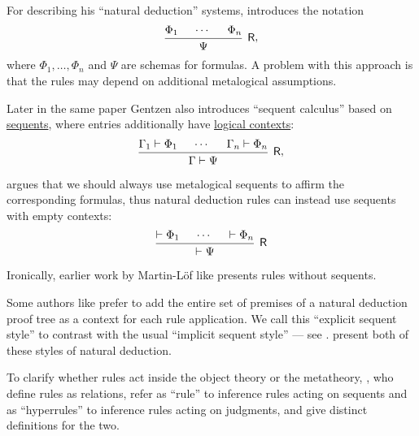 \begin{remark}
  For describing his \enquote{natural deduction} systems,  introduces the notation
  \begin{equation*}
    \begin{prooftree}
      \hypo{ \Phi_1 }
      \hypo{ \cdots }
      \hypo{ \Phi_n }
      \infer3[\logic{R}]{ \Psi }
    \end{prooftree},
  \end{equation*}
  where \( \Phi_1, \ldots, \Phi_n \) and \( \Psi \) are schemas for formulas. A problem with this approach is that the rules may depend on additional metalogical assumptions.

  Later in the same paper Gentzen also introduces \enquote{sequent calculus} based on \hyperref[def:sequent]{sequents}, where entries additionally have \hyperref[def:logical_context]{logical contexts}:
  \begin{equation*}
    \begin{prooftree}
      \hypo{ \Gamma_1 \vdash \Phi_1 }
      \hypo{ \cdots }
      \hypo{ \Gamma_n \vdash \Phi_n }
      \infer3[\logic{R}]{ \Gamma \vdash \Psi }
    \end{prooftree},
  \end{equation*}

   argues that we should always use metalogical sequents to affirm the corresponding formulas, thus natural deduction rules can instead use sequents with empty contexts:
  \begin{equation*}
    \begin{prooftree}
      \hypo{ \vdash \Phi_1 }
      \hypo{ \cdots }
      \hypo{ \vdash \Phi_n }
      \infer3[\logic{R}]{ \vdash \Psi }
    \end{prooftree}
  \end{equation*}

  Ironically, earlier work by Martin-L\"of like \cite{MartinLöf1984IntuitionisticTypeTheory} presents rules without sequents.

  Some authors like  prefer to add the entire set of premises of a natural deduction proof tree as a context for each rule application. We call this \enquote{explicit sequent style} to contrast with the usual \enquote{implicit sequent style} --- see .  present both of these styles of natural deduction.

  To clarify whether rules act inside the object theory or the metatheory, , who define rules as relations, refer as \enquote{rule} to inference rules acting on sequents and as \enquote{hyperrules} to inference rules acting on judgments, and give distinct definitions for the two.
\end{remark}

